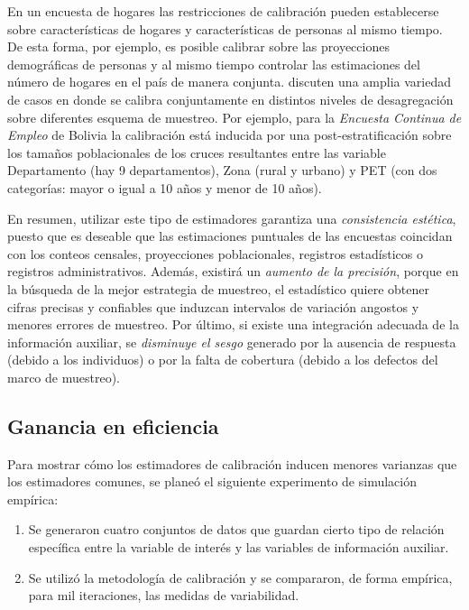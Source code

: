 \documentclass[
  12pt,
]{book}
\providecommand{\tightlist}{%
  \setlength{\itemsep}{0pt}\setlength{\parskip}{0pt}}
\begin{document}
En un encuesta de hogares las restricciones de calibración pueden establecerse sobre características de hogares y características de personas al mismo tiempo. De esta forma, por ejemplo, es posible calibrar sobre las proyecciones demográficas de personas y al mismo tiempo controlar las estimaciones del número de hogares en el país de manera conjunta. \citet{Estevao_Sarndal_2006} discuten una amplia variedad de casos en donde se calibra conjuntamente en distintos niveles de desagregación sobre diferentes esquema de muestreo. Por ejemplo, para la \emph{Encuesta Continua de Empleo} de Bolivia la calibración está inducida por una post-estratificación sobre los tamaños poblacionales de los cruces resultantes entre las variable Departamento (hay 9 departamentos), Zona (rural y urbano) y PET (con dos categorías: mayor o igual a 10 años y menor de 10 años).

En resumen, utilizar este tipo de estimadores garantiza una \emph{consistencia estética}, puesto que es deseable que las estimaciones puntuales de las encuestas coincidan con los conteos censales, proyecciones poblacionales, registros estadísticos o registros administrativos. Además, existirá un \emph{aumento de la precisión}, porque en la búsqueda de la mejor estrategia de muestreo, el estadístico quiere obtener cifras precisas y confiables que induzcan intervalos de variación angostos y menores errores de muestreo. Por último, si existe una integración adecuada de la información auxiliar, se \emph{disminuye el sesgo} generado por la ausencia de respuesta (debido a los individuos) o por la falta de cobertura (debido a los defectos del marco de muestreo).

\hypertarget{ganancia-en-eficiencia}{%
\subsection{Ganancia en eficiencia}\label{ganancia-en-eficiencia}}

Para mostrar cómo los estimadores de calibración inducen menores varianzas que los estimadores comunes, se planeó el siguiente experimento de simulación empírica:

\begin{enumerate}
\def\labelenumi{\arabic{enumi}.}
\tightlist
\item
  Se generaron cuatro conjuntos de datos que guardan cierto tipo de relación específica entre la variable de interés y las variables de información auxiliar.
\item
  Se utilizó la metodología de calibración y se compararon, de forma empírica, para mil iteraciones, las medidas de variabilidad.
\end{enumerate}
\end{document}

